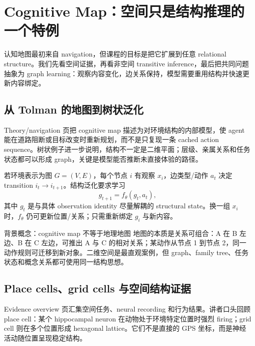 \section{Cognitive Map：空间只是结构推理的一个特例}

认知地图最初来自 navigation，但课程的目标是把它扩展到任意 relational structure。我们先看空间证据，再看非空间 transitive inference，最后把共同问题抽象为 graph learning：观察内容变化，边关系保持，模型需要重用结构并快速更新内容绑定。

\subsection{从 Tolman 的地图到树状泛化}

Theory/navigation 页把 cognitive map 描述为对环境结构的内部模型，使 agent 能在道路阻断或目标改变时重新规划，而不是只复现一条 cached action sequence。树状例子进一步说明，结构不一定是二维平面；层级、亲属关系和任务状态都可以形成 graph，关键是模型能否推断未直接体验的路径。



若环境表示为图 $G=(V,E)$，每个节点 $i$ 有观察 $x_i$，边类型/动作 $a_t$ 决定 transition $i_t\to i_{t+1}$。结构泛化要求学习
$$
g_{t+1}=f_{\theta}(g_t,a_t),
$$
其中 $g_t$ 是与具体 observation identity 尽量解耦的 structural state。换一组 $x_i$ 时，$f_{\theta}$ 仍可更新位置/关系；只需重新绑定 $g_i$ 与新内容。

\begin{knowledgebox}{背景概念：cognitive map 不等于地理地图}
地图的本质是关系可组合：A 在 B 左边、B 在 C 左边，可推出 A 与 C 的相对关系；某动作从节点 1 到节点 2，同一动作规则可迁移到新对象。二维空间是最直观案例，但 graph、family tree、任务状态和概念关系都可使用同一结构思想。
\end{knowledgebox}

\subsection{Place cells、grid cells 与空间结构证据}

Evidence overview 页汇集空间任务、neural recording 和行为结果。讲者口头回顾 place cell：某个 hippocampal neuron 在动物处于环境特定位置时强烈 firing；grid cell 则在多个位置形成 hexagonal lattice。它们不是直接的 GPS 坐标，而是神经活动随位置呈现稳定结构。

